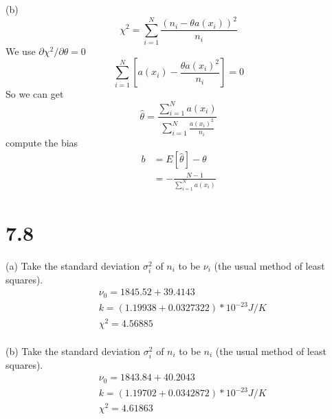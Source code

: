 \documentclass{article}
\begin{document}
\begin{CJK*}{GBK}{song}
(b)
\begin{equation}
\chi^2=\sum_{i=1}^N\frac{(n_i-\theta a(x_i))^2}{n_i}
\end{equation}
We use $\partial \chi^2/\partial\theta=0$
\begin{equation}
\sum_{i=1}^N[a(x_i)-\frac{\theta a(x_i)^2}{n_i}]=0
\end{equation}
So we can get
\begin{equation}
\hat{\theta}=\frac{\sum_{i=1}^Na(x_i)}{\sum_{i=1}^N\frac{a(x_i)^2}{n_i}}
\end{equation}
compute the bias
\begin{equation}
\begin{aligned}
b&=E[\hat{\theta}]-\theta\\
&=-\frac{N-1}{\sum_{i=1}^Na(x_i)}
\end{aligned}
\end{equation}


\section{7.8}
(a)
Take the standard deviation $\sigma_i^2$ of $n_i$ to be $\nu_i$ (the usual method of least squares).
\begin{equation}
\begin{aligned}
&\nu_0=1845.52+39.4143\\
&k=(1.19938+0.0327322)*10^{-23}J/K\\
&\chi^2=4.56885\\
\end{aligned}
\end{equation}

(b)
Take the standard deviation $\sigma_i^2$ of $n_i$ to be $n_i$ (the usual method of least squares).
\begin{equation}
\begin{aligned}
&\nu_0=1843.84+40.2043\\
&k=(1.19702+0.0342872)*10^{-23}J/K\\
&\chi^2=4.61863\\
\end{aligned}
\end{equation}




















\end{CJK*}
\end{document}
